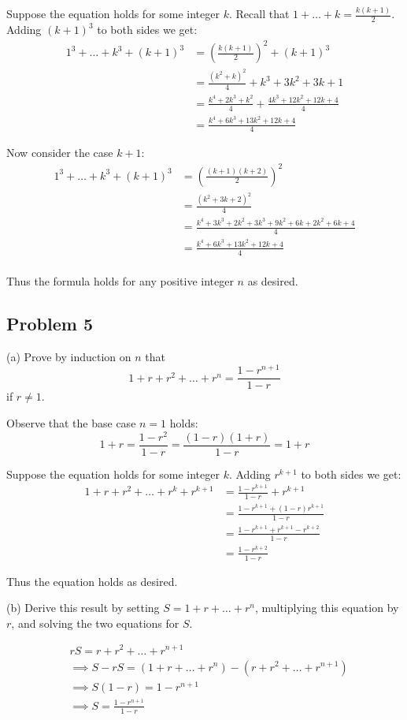 Suppose the equation holds for some integer $k$. Recall that $1+\ldots+k=\frac{k(k+1)}{2}$. Adding $(k+1)^3$ to both sides we get:
\begin{align*}
    1^3+\ldots+k^3+(k+1)^3&=\left(\frac{k(k+1)}{2}\right)^2+(k+1)^3\\
    &=\frac{(k^2+k)^2}{4}+k^3+3k^2+3k+1\\
    &=\frac{k^4+2k^3+k^2}{4}+\frac{4k^3+12k^2+12k+4}{4}\\
    &=\frac{k^4+6k^3+13k^2+12k+4}{4}
\end{align*}

Now consider the case $k+1$:
\begin{align*}
    1^3+\ldots+k^3+(k+1)^3&=\left(\frac{(k+1)(k+2)}{2}\right)^2\\
    &=\frac{(k^2+3k+2)^2}{4}\\
    &=\frac{k^4+3k^3+2k^2+3k^3+9k^2+6k+2k^2+6k+4}{4}\\
    &=\frac{k^4+6k^3+13k^2+12k+4}{4}\\
\end{align*}

Thus the formula holds for any positive integer $n$ as desired.

\subsection*{Problem 5}
(a) Prove by induction on $n$ that
\[1+r+r^2+\ldots+r^n=\frac{1-r^{n+1}}{1-r}\]
if $r\neq 1$.

Observe that the base case $n=1$ holds:
\[1+r=\frac{1-r^2}{1-r}=\frac{(1-r)(1+r)}{1-r}=1+r\]

Suppose the equation holds for some integer $k$. Adding $r^{k+1}$ to both sides we get:
\begin{align*}
    1+r+r^2+\ldots+r^k+r^{k+1}&=\frac{1-r^{k+1}}{1-r}+r^{k+1}\\
    &=\frac{1-r^{k+1}+(1-r)r^{k+1}}{1-r}\\
    &=\frac{1-r^{k+1}+r^{k+1}-r^{k+2}}{1-r}\\
    &=\frac{1-r^{k+2}}{1-r}
\end{align*}

Thus the equation holds as desired.

\vs

(b) Derive this result by setting $S=1+r+\ldots+r^n$, multiplying this equation by $r$, and solving the two equations for $S$.

\begin{align*}
&rS=r+r^2+\ldots+r^{n+1}\\
&\implies S-rS=(1+r+\ldots+r^n)-(r+r^2+\ldots+r^{n+1})\\
&\implies S(1-r)=1-r^{n+1}\\
&\implies S=\frac{1-r^{n+1}}{1-r}
\end{align*}

